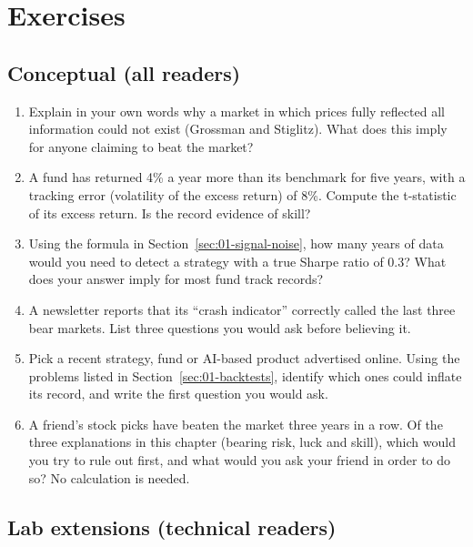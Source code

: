 \section*{Exercises}

\subsection*{Conceptual (all readers)}

\begin{enumerate}
  \item Explain in your own words why a market in which prices fully reflected all information could not exist (Grossman and Stiglitz). What does this imply for anyone claiming to beat the market?
  \item A fund has returned 4\% a year more than its benchmark for five years, with a tracking error (volatility of the excess return) of 8\%. Compute the t-statistic of its excess return. Is the record evidence of skill?
  \item Using the formula in Section~\ref{sec:01-signal-noise}, how many years of data would you need to detect a strategy with a true Sharpe ratio of 0.3? What does your answer imply for most fund track records?
  \item A newsletter reports that its ``crash indicator'' correctly called the last three bear markets. List three questions you would ask before believing it.
  \item Pick a recent strategy, fund or AI-based product advertised online. Using the problems listed in Section~\ref{sec:01-backtests}, identify which ones could inflate its record, and write the first question you would ask.
  \item A friend's stock picks have beaten the market three years in a row. Of the three explanations in this chapter (bearing risk, luck and skill), which would you try to rule out first, and what would you ask your friend in order to do so? No calculation is needed.
\end{enumerate}

\subsection*{Lab extensions (technical readers)}

